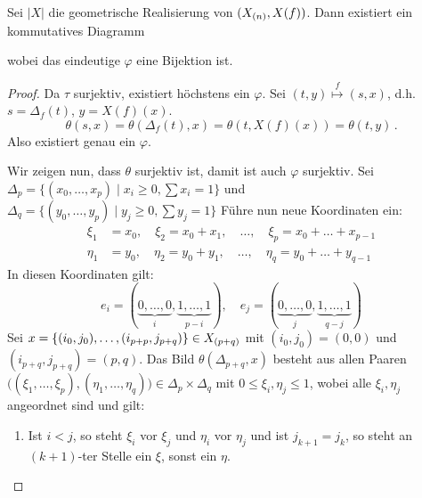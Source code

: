 \begin{lemma}
  Sei $|X|$ die geometrische Realisierung von $(X_{(n)}, X(f))$. Dann
  existiert ein kommutatives Diagramm
  \begin{center}
  \end{center}
  wobei das eindeutige $\varphi$ eine Bijektion ist.
\end{lemma}
\begin{proof}
  Da $\tau$ surjektiv, existiert höchstens ein $\varphi$. Sei 
  $(t,y) \overset f \longmapsto (s,x)$, d.h. $s = \Delta_f(t)$, 
  $y = X(f)(x)$.
  \[ \theta(s,x) = \theta(\Delta_f(t),x) = \theta(t, X(f)(x))
    = \theta(t,y)\,.\]
  Also existiert genau ein $\varphi$.

  Wir zeigen nun, dass $\theta$ surjektiv ist, damit ist auch $\varphi$
  surjektiv.
  Sei $\Delta_p = \{ (x_0,\ldots, x_p) \mid x_i\geq 0, \sum x_i = 1\}$
  und $\Delta_q = \{ (y_0,\ldots,y_p) \mid y_j\geq 0, \sum y_j = 1\}$
  Führe nun neue Koordinaten ein:
  \begin{align*}
    \xi_1 &= x_0,\quad \xi_2 = x_0+x_1,\quad\ldots,\quad 
      \xi_p = x_0 + \ldots + x_{p-1}\\
    \eta_1 &= y_0, \quad \eta_2 = y_0+y_1, \quad\ldots,\quad 
      \eta_q = y_0 + \ldots + y_{q-1}
  \end{align*}
  In diesen Koordinaten gilt:
  \[ e_i = (\underbrace{0,\ldots,0}_i, \underbrace{1,\ldots,1}_{p-i}),\quad
  e_j = (\underbrace{0,\ldots,0}_j, \underbrace{1,\ldots,1}_{q-j}) \]
  Sei $x = \{(i_0,j_0) ,\ldots, (i_{p+p},j_{p+q})\} \in X_{(p+q)}$ mit
  $(i_0,j_0) = (0,0)$ und $(i_{p+q},j_{p+q}) = (p,q)$.
  Das Bild $\theta(\Delta_{p+q}, x)$ besteht aus allen Paaren
  $\big( (\xi_1,\ldots,\xi_p),(\eta_1,\ldots,\eta_q) \big) \in 
  \Delta_p\times\Delta_q$ mit $0\leq \xi_i,\eta_j\leq 1$, wobei alle
  $\xi_i,\eta_j$ angeordnet sind und gilt:
  \begin{enumerate}[label=(\roman*)]
    \item Ist $i<j$, so steht $\xi_i$ vor $\xi_j$ und $\eta_i$ vor $\eta_j$
      und ist $j_{k+1} = j_k$, so steht an $(k+1)$-ter Stelle
      ein $\xi$, sonst ein $\eta$.
  \end{enumerate}
\end{proof}

